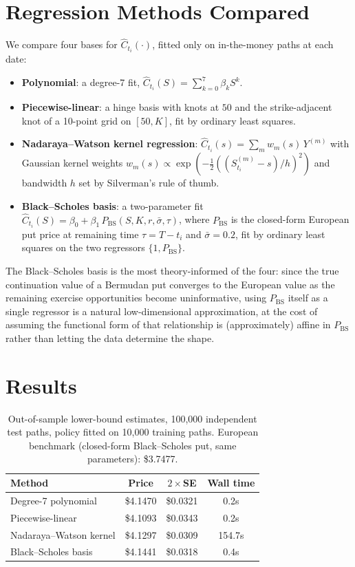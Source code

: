 \documentclass[11pt]{article}
\begin{document}
\section{Regression Methods Compared}

We compare four bases for $\widehat C_{t_i}(\cdot)$, fitted only on in-the-money paths at each date:

\begin{itemize}
\item \textbf{Polynomial}: a degree-7 fit, $\widehat C_{t_i}(S) = \sum_{k=0}^{7} \beta_k S^k$.
\item \textbf{Piecewise-linear}: a hinge basis with knots at $50$ and the strike-adjacent knot of a 10-point grid on $[50,K]$, fit by ordinary least squares.
\item \textbf{Nadaraya--Watson kernel regression}: $\widehat C_{t_i}(s) = \sum_m w_m(s)\, Y^{(m)}$ with Gaussian kernel weights $w_m(s) \propto \exp(-\tfrac{1}{2}((S_{t_i}^{(m)}-s)/h)^2)$ and bandwidth $h$ set by Silverman's rule of thumb.
\item \textbf{Black--Scholes basis}: a two-parameter fit $\widehat C_{t_i}(S) = \beta_0 + \beta_1\, P_{\mathrm{BS}}(S, K, r, \bar\sigma, \tau)$, where $P_{\mathrm{BS}}$ is the closed-form European put price at remaining time $\tau = T - t_i$ and $\bar\sigma = 0.2$, fit by ordinary least squares on the two regressors $\{1, P_{\mathrm{BS}}\}$.
\end{itemize}

The Black--Scholes basis is the most theory-informed of the four: since the true continuation value of a Bermudan put converges to the European value as the remaining exercise opportunities become uninformative, using $P_{\mathrm{BS}}$ itself as a single regressor is a natural low-dimensional approximation, at the cost of assuming the functional form of that relationship is (approximately) affine in $P_{\mathrm{BS}}$ rather than letting the data determine the shape.

\section{Results}
\label{sec:results}

\begin{table}[htbp]\centering
\caption{Out-of-sample lower-bound estimates, 100{,}000 independent test paths, policy fitted on 10{,}000 training paths. European benchmark (closed-form Black--Scholes put, same parameters): \$3.7477.}
\label{tab:results}
\begin{tabular}{lccc}
\toprule
Method & Price & $2\times$SE & Wall time \\
\midrule
Degree-7 polynomial     & \$4.1470 & \$0.0321 & 0.2s \\
Piecewise-linear        & \$4.1093 & \$0.0343 & 0.2s \\
Nadaraya--Watson kernel & \$4.1297 & \$0.0309 & 154.7s \\
Black--Scholes basis    & \$4.1441 & \$0.0318 & 0.4s \\
\bottomrule
\end{tabular}
\end{table}
\end{document}
